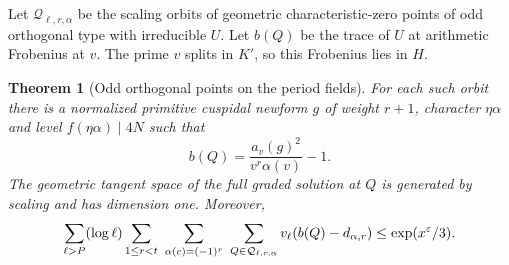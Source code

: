 \documentclass[a4paper,11pt]{article}
\newtheorem{theorem}[proposition]{Theorem}
\theoremstyle{definition}
\theoremstyle{remark}
\numberwithin{equation}{section}
\begin{document}
Let \(\mathcal Q_{\ell,r,\alpha}\) be the scaling orbits of
geometric characteristic-zero points of odd orthogonal type
with irreducible \(U\). Let \(b(Q)\) be the trace of \(U\)
at arithmetic Frobenius at \(v\). The prime \(v\) splits
in \(K'\), so this Frobenius lies in \(H\).

\begin{theorem}[Odd orthogonal points on the period fields]
\label{thm:oddtrace123}
For each such orbit there is a normalized primitive cuspidal
newform \(g\) of weight \(r+1\), character \(\eta\alpha\)
and level \(f(\eta\alpha)\mid4N\) such that
\[
     b(Q)=\frac{a_v(g)^2}{v^r\alpha(v)}-1 .
\]
The geometric tangent space of the full graded solution at \(Q\)
is generated by scaling and has dimension one. Moreover,
\begin{equation}
 \sum_{\ell>P}(\log\ell)\sum_{1\le r<t}
     \ \sum_{\alpha(c)=(-1)^r}\ 
     \sum_{Q\in\mathcal Q_{\ell,r,\alpha}}
        v_\ell\!\left(b(Q)-d_{\alpha,r}\right)
       \le \exp(x^\eps/3).                           \label{eq:oddtrace123}
\end{equation}
\end{theorem}
\end{document}
